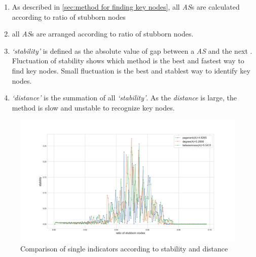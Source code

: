 \begin{enumerate}
	\item As described in \ref{sec:method for finding key nodes}, all \textit{AS}s are calculated according to ratio of stubborn nodes   
	\item all \textit{AS}s are arranged according to ratio of stubborn nodes. 
	\item \textit{`stability'} is defined as the absolute value of gap between a \textit{AS} and the next . Fluctuation of stability shows which method is the best and fastest way to find key nodes. Small fluctuation is the best and stablest way to identify key nodes. 
	\item \textit{`distance'} is the summation of all \textit{`stability'}. As the \textit{distance} is large, the method is slow and unstable to recognize key nodes.
\end{enumerate}
\begin{figure}[!htb]
	\centering
	\includegraphics[width=\hsize]{figure/chap5_keynode_A_2.png}
	\caption{Comparison of single indicators according to stability and distance  }
	\label{chap5_keynode_A_2}
\end{figure}

